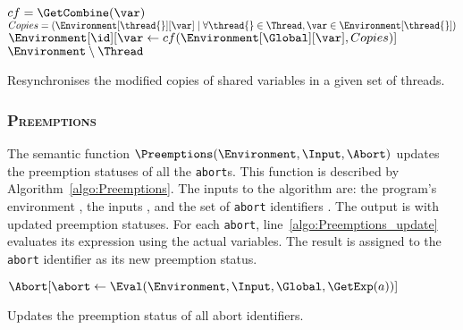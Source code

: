 \begin{algorithm}[t]
	\begin{algorithmic}[1]
		\Function{$\Resync$}{\Environment{}, \Thread{}, \id{}}
			\ForAll {$\var \in \Shared(\Environment[\Global])$}										\label{algo:Resync_for}
				\State $cf = \GetCombine(\var)$														\label{algo:Resync_c}
				\State $Copies = ( \Environment[\thread{}][\var] \mid \forall \thread{} \in \Thread, \var \in \Environment[\thread{}] )$	\label{algo:Resync_find}
					\State $\Environment[\id][\var \gets cf(\Environment[\Global][\var], Copies)]$	\label{algo:Resync_assign}
				\EndIf
			\EndFor
			\State \Return $\Environment \setminus \Thread$											\label{algo:Resync_return}
		\EndFunction
	\end{algorithmic}
	
	\caption{Resynchronises the modified copies of shared variables in a given set of threads.}
	\label{algo:Resync}
\end{algorithm}

\subsubsection{\textsc{Preemptions}}
\label{sec:forec_Preemptions}
The semantic function $\Preemptions(\Environment, \Input, \Abort)$
updates the preemption statuses of all the \verb$abort$s. This function
is described by Algorithm~\ref{algo:Preemptions}. The inputs 
to the algorithm are: the program's environment \Environment{}, 
the inputs \Input{}, and the set of \verb$abort$ identifiers \Abort{}. The output is 
\Abort{} with updated preemption statuses. For each \verb$abort$, 
line~\ref{algo:Preemptions_update} evaluates its expression 
using the actual variables. The result 
is assigned to the \verb$abort$ identifier as its new preemption 
status.

\begin{algorithm}[t]
	\begin{algorithmic}[1]
		\Function{$\Preemptions$}{\Environment{}, \Input{}, \Abort{}}
			\ForAll {$\abort \in \Abort$}
				\State $\Abort[\abort \gets \Eval(\Environment, \Input, \Global, \GetExp(a))]$	\label{algo:Preemptions_update}
			\EndFor
			\State \Return \Abort
		\EndFunction
	\end{algorithmic}
	
	\caption{Updates the preemption status of all abort identifiers.}
	\label{algo:Preemptions}
\end{algorithm}


